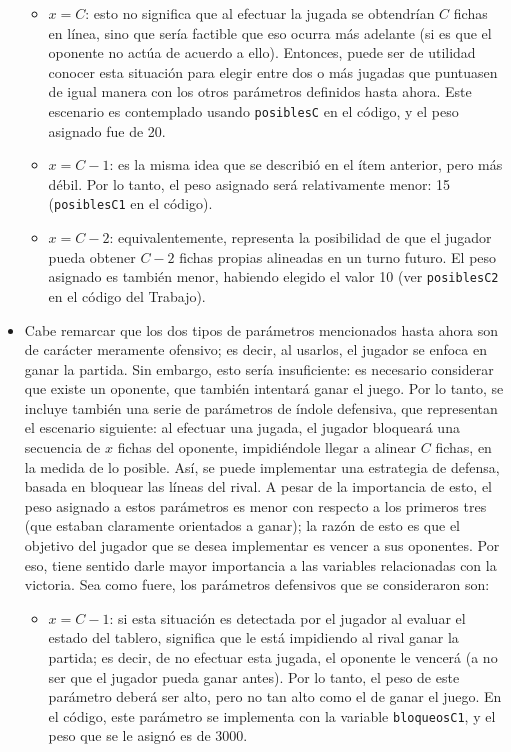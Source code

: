 \documentclass[12pt,a4paper]{article}
\begin{document}
\begin{itemize}
            \begin{itemize}
                \item $x = C$: esto no significa que al efectuar la jugada se obtendrían $C$ fichas en línea, sino que sería factible que eso ocurra más adelante (si es que el oponente no actúa de acuerdo a ello). Entonces, puede ser de utilidad conocer esta situación para elegir entre dos o más jugadas que puntuasen de igual manera con los otros parámetros definidos hasta ahora. Este escenario es contemplado usando \texttt{posiblesC} en el código, y el peso asignado fue de 20.
                \item $x = C-1$: es la misma idea que se describió en el ítem anterior, pero más débil. Por lo tanto, el peso asignado será relativamente menor: 15 (\texttt{posiblesC1} en el código).
                \item $x = C-2$: equivalentemente, representa la posibilidad de que el jugador pueda obtener $C-2$ fichas propias alineadas en un turno futuro. El peso asignado es también menor, habiendo elegido el valor 10 (ver \texttt{posiblesC2} en el código del Trabajo).
            \end{itemize}
        \item Cabe remarcar que los dos tipos de parámetros mencionados hasta ahora son de carácter meramente ofensivo; es decir, al usarlos, el jugador se enfoca en ganar la partida. Sin embargo, esto sería insuficiente: es necesario considerar que existe un oponente, que también intentará ganar el juego. Por lo tanto, se incluye también una serie de parámetros de índole defensiva, que representan el escenario siguiente: al efectuar una jugada, el jugador bloqueará una secuencia de $x$ fichas del oponente, impidiéndole llegar a alinear $C$ fichas, en la medida de lo posible. Así, se puede implementar una estrategia de defensa, basada en bloquear las líneas del rival. A pesar de la importancia de esto, el peso asignado a estos parámetros es menor con respecto a los primeros tres (que estaban claramente orientados a ganar); la razón de esto es que el objetivo del jugador que se desea implementar es vencer a sus oponentes. Por eso, tiene sentido darle mayor importancia a las variables relacionadas con la victoria. Sea como fuere, los parámetros defensivos que se consideraron son:
            \begin{itemize}
                \item $x = C-1$: si esta situación es detectada por el jugador al evaluar el estado del tablero, significa que le está impidiendo al rival ganar la partida; es decir, de no efectuar esta jugada, el oponente le vencerá (a no ser que el jugador pueda ganar antes). Por lo tanto, el peso de este parámetro deberá ser alto, pero no tan alto como el de ganar el juego. En el código, este parámetro se implementa con la variable \texttt{bloqueosC1}, y el peso que se le asignó es de 3000.

\end{itemize}
\end{itemize}
\end{document}
